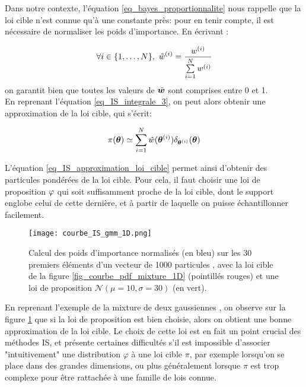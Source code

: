  Dans notre contexte, l'équation \eqref{eq_bayes_proportionnalite} nous rappelle que la loi cible n'est connue qu'à une constante près: pour en tenir compte, il est nécessaire de normaliser les poids d'importance. En écrivant : 
 
 \begin{equation}
 \forall i \in \{1, \dots, N\}, ~ {\tilde{w}}^{(i)} = \dfrac{w^{(i)}}{\sum\limits_{i=1}^N w^{(i)}}
 \label{eq_IS_poids_normalises}
 \end{equation}
 on garantit bien que toutes les valeurs de ${\tilde{\bm{w}}}$ sont comprises entre 0 et 1. \\
 
 En reprenant l'équation \eqref{eq_IS_integrale_3}, on peut alors obtenir une approximation de la loi cible, qui s'écrit:
 
 \begin{equation}
 \pi({\bm{\theta}}) \simeq \sum\limits_{i=1}^N {\tilde{w}}({\bm{\theta}}^{(i)})\delta_{{\bm{\theta}}^{(i)}}({\bm{\theta}})
 \label{eq_IS_approximation_loi_cible}
 \end{equation}

L'équation \eqref{eq_IS_approximation_loi_cible} permet ainsi d'obtenir des particules pondérées de la loi cible. Pour cela, il faut choisir une loi de proposition ${\varphi}$ qui soit suffisamment proche de la loi cible, dont le support englobe celui de cette dernière, et à partir de laquelle on puisse échantillonner facilement. \\

\begin{figure}[h!]
	\centering
	\texttt{[image: courbe\_IS\_gmm\_1D.png]}
	\caption{Calcul des poids d'importance normalisés  (en bleu) sur les 30 premiers éléments d'un vecteur de 1000 particules , avec la loi cible de la figure \ref{fig_courbe_pdf_mixture_1D} (pointillés rouges) et une loi de proposition $\mathcal{N}(\mu = 10, \sigma = 30)$ (en vert).  }
	\label{fig_IS_gmm_1D}
\end{figure}

En reprenant l'exemple de la mixture de deux gaussiennes , on observe sur la figure \ref{fig_IS_gmm_1D} que si la loi de proposition est bien choisie, alors on obtient une bonne approximation de la loi cible. Le choix de cette loi est en fait un point crucial des méthodes IS, et présente certaines difficultés s'il est impossible d'associer "intuitivement" une distribution $\varphi$ à une loi cible $\pi$, par exemple lorsqu'on se place dans des grandes dimensions, ou plus généralement lorsque $\pi$ est trop complexe pour être rattachée à une famille de lois connue. 

